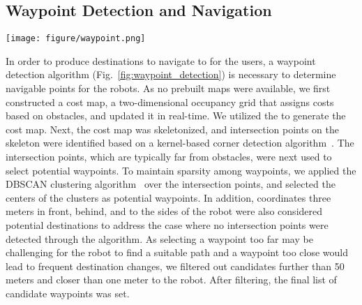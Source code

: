 \subsection{Waypoint Detection and Navigation}
\label{sec:waypoint_detection}

\begin{figure*}
    \centering
    \texttt{[image: figure/waypoint.png]}
    \caption{Three steps of the waypoint detection algorithm. Step 1 shows the generated cost map, while Step 2 depicts the skeletonization process of the cost map along with the detection of intersection points. Finally, Step 3 highlights the selected intersection points, which are identified as waypoint candidates.}
\label{fig:waypoint_detection}
\end{figure*}

In order to produce destinations to navigate to for the users, a waypoint detection algorithm (Fig.~\ref{fig:waypoint_detection}) is necessary to determine navigable points for the robots.
As no prebuilt maps were available, we first constructed a cost map, a two-dimensional occupancy grid that assigns costs based on obstacles, and updated it in real-time. 
We utilized the  to generate the cost map.
Next, the cost map was skeletonized, and intersection points on the skeleton were identified based on a kernel-based corner detection algorithm~\cite{soille1999morphological}.
The intersection points, which are typically far from obstacles, were next used to select potential waypoints.
To maintain sparsity among waypoints, we applied the DBSCAN clustering algorithm~\cite{ester1996density} over the intersection points, and selected the centers of the clusters as potential waypoints.
In addition, coordinates three meters in front, behind, and to the sides of the robot were also considered potential destinations to address the case where no intersection points were detected through the algorithm.
As selecting a waypoint too far may be challenging for the robot to find a suitable path and a waypoint too close would lead to frequent destination changes, we filtered out candidates further than 50 meters and closer than one meter to the robot.
After filtering, the final list of candidate waypoints was set.

